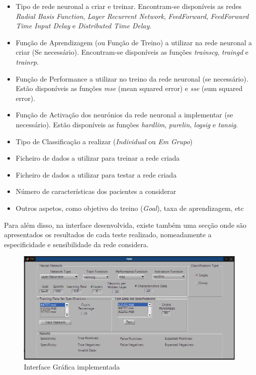 \documentclass{article}
\begin{document}
\begin{itemize}
\item Tipo de rede neuronal a criar e treinar. Encontram-se disponíveis as redes \emph{Radial Basis Function}, \emph{Layer Recurrent Network}, \emph{FeedForward}, \emph{FeedForward Time Input Delay} e \emph{Distributed Time Delay}.

\item Função de Aprendizagem (ou Função de Treino) a utilizar na rede neuronal a criar (Se necessário). Encontram-se disponíveis as funções \emph{trainscg}, \emph{traingd} e \emph{trainrp}.

\item Função de Performance a utilizar no treino da rede neuronal (se necessário). Estão disponíveis as funções \emph{mse} (mean squared error) e \emph{sse} (sum squared error).

\item Função de Activação dos neurónios da rede neuronal a implementar (se necessário). Estão disponíveis as funções \emph{hardlim}, \emph{purelin}, \emph{logsig} e \emph{tansig}.

\item Tipo de Classificação a realizar (\emph{Individual} ou \emph{Em Grupo})

\item Ficheiro de dados a utilizar para treinar a rede criada

\item Ficheiro de dados a utilizar para testar a rede criada

\item Número de características dos pacientes a considerar

\item Outros aspetos, como objetivo do treino (\emph{Goal}), taxa de aprendizagem, etc
\end{itemize}

Para além disso, na interface desenvolvida, existe também uma secção onde são apresentados os resultados de cada teste realizado, nomeadamente a especificidade e sensibilidade da rede considera.

\begin{figure}[h]
  \centering
      \includegraphics[scale=0.3]{Images/Aplication_GUI.png}
  \caption{Interface Gráfica implementada}
\end{figure}
\end{document}

